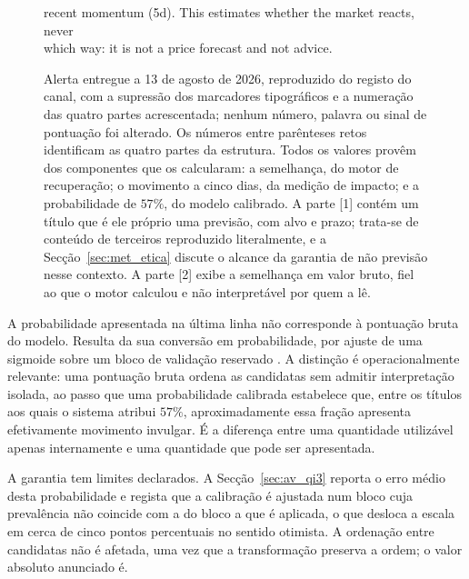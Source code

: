 \begin{figure}[htbp]
\begin{tcolorbox}[colback=black!3, colframe=black!35, boxrule=0.4pt, arc=2pt,
                  width=0.97\textwidth, fontupper=\ttfamily\scriptsize]
\hspace*{1em}recent momentum (5d). This estimates whether the market reacts, never\\
\hspace*{1em}which way: it is not a price forecast and not advice.
\end{tcolorbox}
\caption[Alerta entregue ao canal]{Alerta entregue a 13 de agosto de 2026, reproduzido do registo
do canal, com a supressão dos marcadores tipográficos e a numeração das
quatro partes acrescentada; nenhum número, palavra ou sinal de pontuação foi alterado. Os números
entre parênteses retos identificam as quatro partes da estrutura. Todos os
valores provêm dos componentes que os calcularam: a semelhança, do motor de recuperação; o
movimento a cinco dias, da medição de impacto; e a probabilidade de $57\%$, do modelo calibrado. A
parte \textnormal{[1]} contém um título que é ele próprio uma previsão, com alvo e prazo; trata-se
de conteúdo de terceiros reproduzido literalmente, e a Secção~\ref{sec:met_etica} discute o
alcance da garantia de não previsão nesse contexto. A parte \textnormal{[2]} exibe a semelhança em
valor bruto, fiel ao que o motor calculou e não interpretável por quem a lê.}
\label{fig:sis_alerta}
\end{figure}

A probabilidade apresentada na última linha não corresponde à pontuação bruta do modelo. Resulta
da sua conversão em probabilidade, por ajuste de uma sigmoide sobre um bloco de validação
reservado \autocite{niculescu2005calibration}. A distinção é operacionalmente relevante: uma
pontuação bruta ordena as candidatas sem admitir interpretação isolada, ao passo que uma
probabilidade calibrada estabelece que, entre os títulos aos quais o sistema atribui $57\%$,
aproximadamente essa fração apresenta efetivamente movimento invulgar. É a diferença entre uma
quantidade utilizável apenas internamente e uma quantidade que pode ser apresentada.

A garantia tem limites declarados. A Secção~\ref{sec:av_qi3} reporta o erro médio desta
probabilidade e regista que a calibração é ajustada num bloco cuja prevalência não coincide com a
do bloco a que é aplicada, o que desloca a escala em cerca de cinco pontos percentuais no sentido
otimista. A ordenação entre candidatas não é afetada, uma vez que a transformação preserva a
ordem; o valor absoluto anunciado é.

